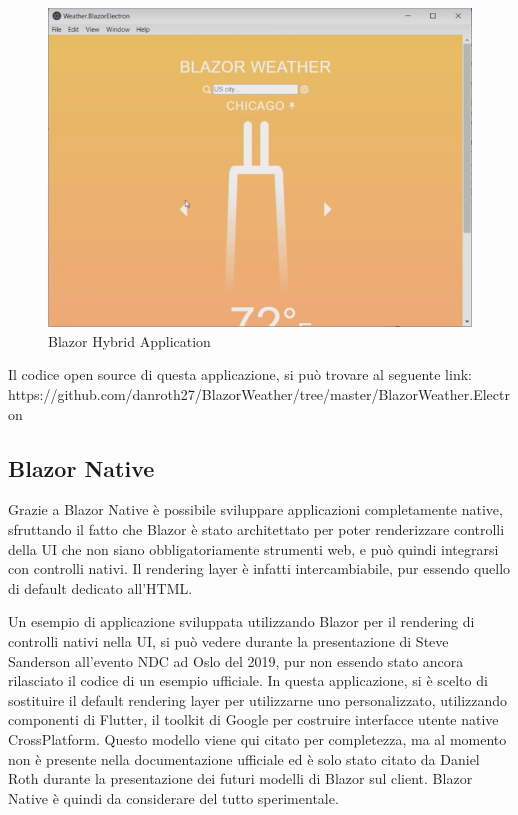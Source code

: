 \begin{figure}[H]
	\centerline{\includegraphics[scale=0.6]{figure/BlazorWeatherElectron.png}}
	\caption{Blazor Hybrid Application}
	\label{fig:BlazorHybridApplication}
\end{figure}

Il codice open source di questa applicazione, si pu\`o trovare al seguente link: https://github.com/danroth27/BlazorWeather/tree/master/BlazorWeather.Electron
\pagebreak

\subsection{Blazor Native}\label{sez:bnative}
Grazie a Blazor Native \`e possibile sviluppare applicazioni completamente native, sfruttando il fatto che Blazor \`e stato architettato per poter renderizzare controlli della UI che non siano obbligatoriamente strumenti web, e pu\`o quindi integrarsi con controlli nativi.
Il rendering layer \`e infatti intercambiabile, pur essendo quello di default dedicato all'HTML.

Un esempio di applicazione sviluppata utilizzando Blazor per il rendering di controlli nativi nella UI, si pu\`o vedere durante la presentazione di Steve Sanderson all'evento NDC ad Oslo del 2019, pur non essendo stato ancora rilasciato il codice di un esempio ufficiale\cite{sandersonNDCBlutter}.
In questa applicazione, si \`e scelto di sostituire il default rendering layer per utilizzarne uno personalizzato, utilizzando componenti di Flutter, il toolkit di Google per costruire interfacce utente native CrossPlatform.
Questo modello viene qui citato per completezza, ma al momento non \`e presente nella documentazione ufficiale ed \`e solo stato citato da Daniel Roth durante la presentazione dei futuri modelli di Blazor sul client\cite{blazorNative}.
Blazor Native \`e quindi da considerare del tutto sperimentale.

